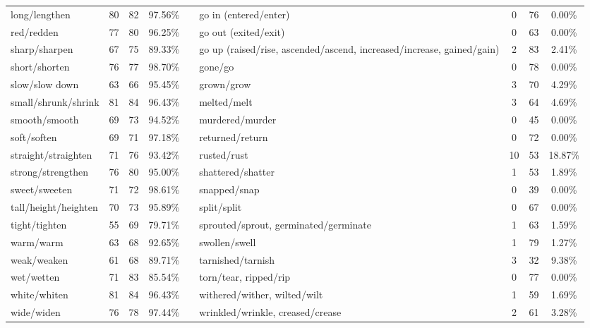 \begin{tabular}{p{3cm}ccccp{3cm}ccc}
long/lengthen & 80 & 82 & 97.56\% & & go in (entered/enter) & 0 & 76 & 0.00\% \\
red/redden & 77 & 80 & 96.25\% & & go out (exited/exit) & 0 & 63 & 0.00\% \\
sharp/sharpen & 67 & 75 & 89.33\% & & go up (raised/rise, ascended/ascend, increased/increase, gained/gain) & 2 & 83 & 2.41\% \\
short/shorten & 76 & 77 & 98.70\% & & gone/go & 0 & 78 & 0.00\% \\
slow/slow down & 63 & 66 & 95.45\% & & grown/grow & 3 & 70 & 4.29\% \\
small/shrunk/shrink & 81 & 84 & 96.43\% & & melted/melt & 3 & 64 & 4.69\% \\
smooth/smooth & 69 & 73 & 94.52\% & & murdered/murder & 0 & 45 & 0.00\% \\
soft/soften & 69 & 71 & 97.18\% & & returned/return & 0 & 72 & 0.00\% \\
straight/straighten & 71 & 76 & 93.42\% & & rusted/rust & 10 & 53 & 18.87\% \\
strong/strengthen & 76 & 80 & 95.00\% & & shattered/shatter & 1 & 53 & 1.89\% \\
sweet/sweeten & 71 & 72 & 98.61\% & & snapped/snap & 0 & 39 & 0.00\% \\
tall/height/heighten & 70 & 73 & 95.89\% & & split/split & 0 & 67 & 0.00\% \\
tight/tighten & 55 & 69 & 79.71\% & & sprouted/sprout, germinated/germinate & 1 & 63 & 1.59\% \\
warm/warm & 63 & 68 & 92.65\% & & swollen/swell & 1 & 79 & 1.27\% \\
weak/weaken & 61 & 68 & 89.71\% & & tarnished/tarnish & 3 & 32 & 9.38\% \\
wet/wetten & 71 & 83 & 85.54\% & & torn/tear, ripped/rip & 0 & 77 & 0.00\% \\
white/whiten & 81 & 84 & 96.43\% & & withered/wither, wilted/wilt & 1 & 59 & 1.69\% \\
wide/widen & 76 & 78 & 97.44\% & & wrinkled/wrinkle, creased/crease & 2 & 61 & 3.28\%
\end{tabular}